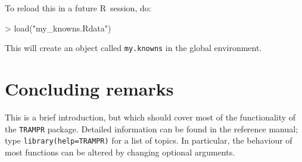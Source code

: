 \documentclass[a4paper]{article}
\newcommand\code\texttt
\newcommand\R{\textsf{R}}
\begin{document}
To reload
this in a future \R\ session, do:
\begin{Schunk}
\begin{Sinput}
> load("my_knowns.Rdata")
\end{Sinput}
\end{Schunk}

This will create an object called \code{my.knowns} in the global
environment.

\section{Concluding remarks}
This is a brief introduction, but which should cover most of the
functionality of the \code{TRAMPR} package.  Detailed information can
be found in the reference manual; type \code{library(help=TRAMPR)} for
a list of topics.  In particular, the behaviour of most functions can
be altered by changing optional arguments.
\end{document}
